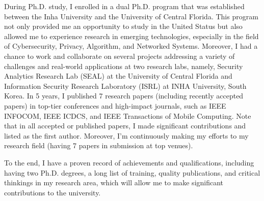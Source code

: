 \documentclass{NSF}
\begin{document}
During Ph.D. study, I enrolled in a dual Ph.D. program that was established between the Inha University and the University of Central Florida. This program not only provided me an opportunity to study in the United Status but also allowed me to experience research in emerging technologies, especially in the field of Cybersecurity, Privacy, Algorithm, and Networked Systems. Moreover, I had a chance to work and collaborate on several projects addressing a variety of challenges and real-world applications at two research labs, namely, Security Analytics Research Lab (SEAL) at the University of Central Florida and Information Security Research Laboratory (ISRL) at INHA University, South Korea. In 5 years, I published 7  research papers (including recently accepted papers) in top-tier conferences and high-impact journals, such as IEEE INFOCOM, IEEE ICDCS, and IEEE Transactions of Mobile Computing. Note that in all accepted or published papers, I made significant contributions and listed as the first author. Moreover, I'm continuously making my efforts to my research field (having 7 papers in submission at top venues).

To the end, I have a proven record of achievements and qualifications, including having two Ph.D. degrees, a long list of training, quality publications, and critical thinkings in my research area, which will allow me to make significant contributions to the university.
\end{document}
